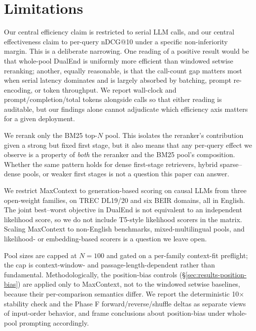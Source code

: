 \section*{Limitations}


Our central efficiency claim is restricted to serial LLM calls, and our central effectiveness claim to per-query nDCG@10 under a specific non-inferiority margin. This is a deliberate narrowing. One reading of a positive result would be that whole-pool DualEnd is uniformly more efficient than windowed setwise reranking; another, equally reasonable, is that the call-count gap matters most when serial latency dominates and is largely absorbed by batching, prompt re-encoding, or token throughput. We report wall-clock and prompt/completion/total tokens alongside calls so that either reading is auditable, but our findings alone cannot adjudicate which efficiency axis matters for a given deployment.

We rerank only the BM25 top-$N$ pool. This isolates the reranker's contribution given a strong but fixed first stage, but it also means that any per-query effect we observe is a property of \emph{both} the reranker and the BM25 pool's composition. Whether the same pattern holds for dense first-stage retrievers, hybrid sparse--dense pools, or weaker first stages is not a question this paper can answer.

We restrict MaxContext to generation-based scoring on causal LLMs from three open-weight families, on TREC DL19/20 and six BEIR domains, all in English. The joint best--worst objective in DualEnd is not equivalent to an independent likelihood score, so we do not include T5-style likelihood scorers in the matrix. Scaling MaxContext to non-English benchmarks, mixed-multilingual pools, and likelihood- or embedding-based scorers is a question we leave open.

Pool sizes are capped at $N{=}100$ and gated on a per-family context-fit preflight; the cap is context-window- and passage-length-dependent rather than fundamental. Methodologically, the position-bias controls (\S\ref{sec:results-position-bias}) are applied only to MaxContext, not to the windowed setwise baselines, because their per-comparison semantics differ. We report the deterministic 10$\times$ stability check and the Phase F forward/reverse/shuffle deltas as separate views of input-order behavior, and frame conclusions about position-bias under whole-pool prompting accordingly.


